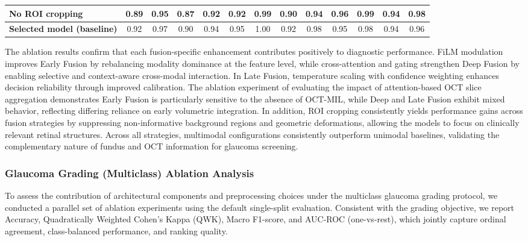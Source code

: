 \documentclass[preprint,12pt]{elsarticle}
\begin{document}
\begin{table}[!t]
\begin{tabular}{|l|cccc|cccc|cccc|}
        \hline
        \textbf{No ROI cropping}           &
        0.89                               & 0.95 & 0.87 & 0.92 &
        0.92                               & 0.99 & 0.90 & 0.94 &
        0.96                               & 0.99 & 0.94 & 0.98         \\
        \hline
        \textbf{Selected model (baseline)} &
        0.92                               & 0.97 & 0.90 & 0.94 &
        0.95                               & 1.00 & 0.92 & 0.98 &
        0.95                               & 0.98 & 0.94 & 0.96         \\
        \hline
    \end{tabular}
\end{table}

The ablation results confirm that each fusion-specific enhancement contributes positively to diagnostic performance. FiLM modulation improves Early Fusion by rebalancing modality dominance at the feature level, while cross-attention and gating strengthen Deep Fusion by enabling selective and context-aware cross-modal interaction. In Late Fusion, temperature scaling with confidence weighting enhances decision reliability through improved calibration. The ablation experiment of evaluating the impact of attention-based OCT slice aggregation demonstrates Early Fusion is particularly sensitive to the absence of OCT-MIL, while Deep and Late Fusion exhibit mixed behavior, reflecting differing reliance on early volumetric integration. In addition, ROI cropping consistently yields performance gains across fusion strategies by suppressing non-informative background regions and geometric deformations, allowing the models to focus on clinically relevant retinal structures. Across all strategies, multimodal configurations consistently outperform unimodal baselines, validating the complementary nature of fundus and OCT information for glaucoma screening.


\subsubsection{Glaucoma Grading (Multiclass) Ablation Analysis}

To assess the contribution of architectural components and preprocessing choices under the multiclass glaucoma grading protocol, we conducted a parallel set of ablation experiments using the default single-split evaluation. Consistent with the grading objective, we report Accuracy, Quadratically Weighted Cohen’s Kappa (QWK), Macro F1-score, and AUC-ROC (one-vs-rest), which jointly capture ordinal agreement, class-balanced performance, and ranking quality.
\end{document}
